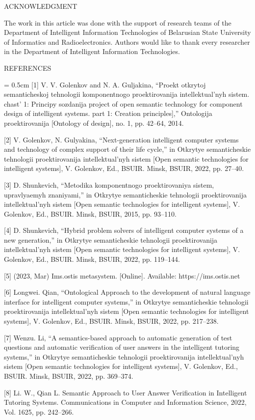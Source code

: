 \documentclass{article}
\begin{document}
\begin{multicols}{2}
 \begin{center}
     ACKNOWLEDGMENT
 \end{center}

The work in this article was done with the support of research teams of the Department of Intelligent Information Technologies of Belarusian State University of Informatics and Radioelectronics. Authors would like to thank every researcher in the Department of Intelligent Information Technologies.

\begin{center}
    REFERENCES
\end{center}
\fontsize{9}{11}\selectfont


\leftskip = 0.5cm [1] V. V. Golenkov and N. A. Guljakina, “Proekt otkrytoj semanticheskoj tehnologii komponentnogo proektirovanija intellektual’nyh sistem. chast’ 1: Principy sozdanija project of open semantic technology for component design of intelligent systems. part 1: Creation principles],” Ontologija proektirovanija [Ontology of design], no. 1, pp. 42–64, 2014.

[2] V. Golenkov, N. Gulyakina, “Next-generation intelligent computer systems and technology of complex support of their life cycle,” in Otkrytye semanticheskie tehnologii proektirovanija intellektual’nyh sistem [Open semantic technologies for intelligent systems], V. Golenkov, Ed., BSUIR. Minsk, BSUIR, 2022, pp. 27–40.

[3] D. Shunkevich, “Metodika komponentnogo proektirovaniya sistem, upravlyaemyh znaniyami,” in Otkrytye semanticheskie tehnologii proektirovanija intellektual’nyh sistem [Open semantic technologies for intelligent systems], V. Golenkov, Ed., BSUIR. Minsk, BSUIR, 2015, pp. 93–110. 

[4] D. Shunkevich, “Hybrid problem solvers of intelligent computer systems of a new generation,” in Otkrytye semanticheskie tehnologii proektirovanija intellektual’nyh sistem [Open semantic technologies for intelligent systems], V. Golenkov, Ed., BSUIR. Minsk, BSUIR, 2022, pp. 119–144.

[5] (2023, Mar) Ims.ostis metasystem. [Online]. Available: https://ims.ostis.net

[6] Longwei. Qian, “Ontological Approach to the development of natural language interface for intelligent computer systems,” in Otkrytye semanticheskie tehnologii proektirovanija intellektual’nyh sistem [Open semantic technologies for intelligent systems], V. Golenkov, Ed., BSUIR. Minsk, BSUIR, 2022, pp. 217–238.

[7] Wenzu. Li, “A semantics-based approach to automatic generation of test questions and automatic verification of user answers in the intelligent tutoring systems,” in Otkrytye semanticheskie tehnologii proektirovanija intellektual’nyh sistem [Open semantic technologies for intelligent systems], V. Golenkov, Ed., BSUIR. Minsk, BSUIR, 2022, pp. 369–374.

[8] Li. W., Qian L. Semantic Approach to User Answer Verification in Intelligent Tutoring Systems. Communications in Computer and Information Science, 2022, Vol. 1625, pp. 242–266.

\end{multicols}
\end{document}
